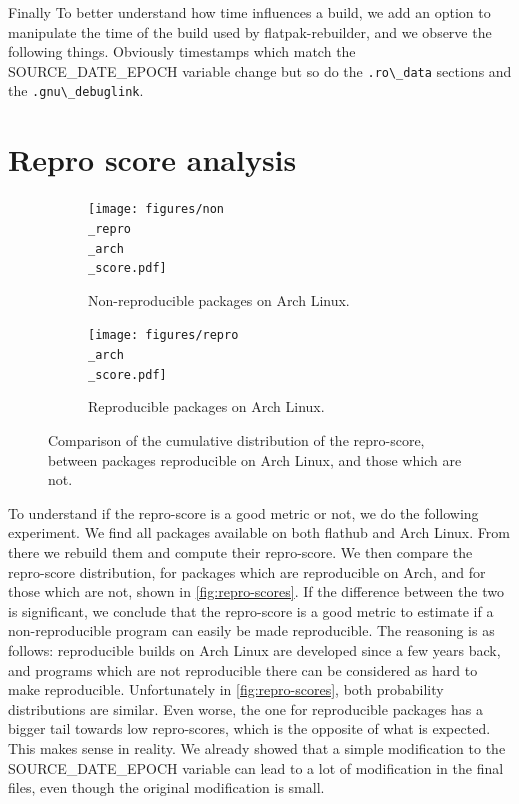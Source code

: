 \documentclass[a4paper,11pt,oneside]{report}
\theoremstyle{definition}
\newcommand{\sysname}{flatpak-rebuilder\xspace}
\newcommand{\rb}{reproducible builds\xspace}
\newcommand{\fh}{flathub\xspace}
\newcommand{\sde}{SOURCE\_DATE\_EPOCH\xspace}
\begin{document}
\noindent
Finally To better understand how time influences a build, we add an option to
manipulate the time of the build used by \sysname, and we observe the following
things. Obviously timestamps which match the \sde variable change but so do the
\verb|.ro\_data| sections and the \verb|.gnu\_debuglink|.

\section{Repro score analysis}
\label{sec:reprscore}
\begin{figure}[h]
\centering
\begin{subfigure}{.5\textwidth}
  \centering
  \texttt{[image: figures/non\\\_repro\\\_arch\\\_score.pdf]}
  \caption{Non-reproducible packages on Arch Linux.}
  \label{fig:sub1}
\end{subfigure}%
\begin{subfigure}{.5\textwidth}
  \centering
  \texttt{[image: figures/repro\\\_arch\\\_score.pdf]}
  \caption{Reproducible packages on Arch Linux.}
  \label{fig:sub2}
\end{subfigure}
\caption{Comparison of the cumulative distribution of the repro-score, between
    packages reproducible on Arch Linux, and those which are not.}
\label{fig:repro-scores}
\end{figure}

To understand if the repro-score is a good metric or not, we do the following
experiment. We find all packages available on both \fh and Arch Linux. From
there we rebuild them and compute their repro-score. We then compare the
repro-score distribution, for packages which are reproducible on Arch, and for
those which are not, shown in \autoref{fig:repro-scores}. If the difference
between the two is significant, we conclude that the repro-score is a good
metric to estimate if a non-reproducible program can easily be made
reproducible. The reasoning is as follows: \rb on Arch Linux are developed
since a few years back, and programs which are not reproducible there can be
considered as hard to make reproducible. Unfortunately in
\autoref{fig:repro-scores}, both probability distributions are similar. Even
worse, the one for reproducible packages has a bigger tail towards low
repro-scores, which is the opposite of what is expected. This makes sense in
reality. We already showed that a simple modification to the \sde variable can
lead to a lot of modification in the final files, even though the original
modification is small.
\end{document}
